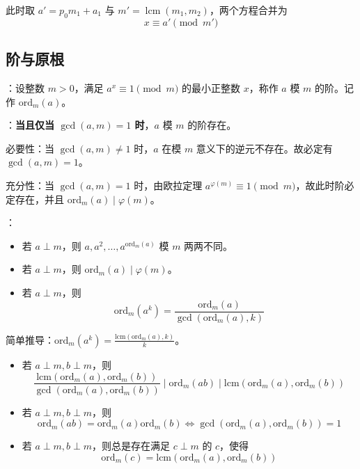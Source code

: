 此时取 $a' = p_0m_1 + a_1$ 与 $m' = \operatorname{lcm}(m_1, m_2)$，两个方程合并为
\[
x \equiv a' \pmod{m'}
\]

\subsection{阶与原根}

：设整数 $m > 0$，满足 $a^x \equiv 1 \pmod m$ 的最小正整数 $x$，称作 $a$ 模 $m$ 的阶。记作 $\mathrm{ord}_m(a)$。

：\textbf{当且仅当 $\gcd(a, m) = 1$ 时}，$a$ 模 $m$ 的阶存在。

\begin{quoteblock}
必要性：当 $\gcd(a, m) \neq 1$ 时，$a$ 在模 $m$ 意义下的逆元不存在。故必定有 $\gcd(a, m) = 1$。

充分性：当 $\gcd(a, m) = 1$ 时，由欧拉定理 $a^{\varphi(m)} \equiv 1 \pmod m$，故此时阶必定存在，并且 $\mathrm{ord}_m(a) \mid \varphi(m)$。
\end{quoteblock}

：

\begin{itemize}
    \item 若 $a\perp m$，则 $a, a^2, \dots, a^{\mathrm{ord}_m(a)}$ 模 $m$ 两两不同。
    \item 若 $a \perp m$，则 $\mathrm{ord}_m(a) \mid \varphi(m)$。
    \item 若 $a \perp m$，则
    \[
    \mathrm{ord}_m(a^k) = \frac{\mathrm{ord}_m(a)}{\gcd(\mathrm{ord}_m(a), k)}
    \]

\end{itemize}

简单推导：$\mathrm{ord}_m(a^k) = \frac{\mathrm{lcm}(\mathrm{ord}_m(a), k)}{k}$。

\begin{itemize}
    \item 若 $a\perp m, b\perp m$，则
    \[
    \frac{\mathrm{lcm}(\mathrm{ord}_m(a), \mathrm{ord}_m(b))}{\gcd(\mathrm{ord}_m(a), \mathrm{ord}_m(b))} \mid
    \mathrm{ord}_m(ab)
    \mid \mathrm{lcm}(\mathrm{ord}_m(a), \mathrm{ord}_m(b))
    \]

    \item 若 $a \perp m, b \perp m$，则
    \[
    \mathrm{ord}_m(ab) = \mathrm{ord}_m(a)\mathrm{ord}_m(b) \iff \gcd(\mathrm{ord}_m(a), \mathrm{ord}_m(b)) = 1
    \]

    \item 若 $a \perp m, b\perp m$，则总是存在满足 $c\perp m$ 的 $c$，使得
    \[
    \mathrm{ord}_m(c) = \mathrm{lcm}(\mathrm{ord}_m(a), \mathrm{ord}_m(b))
    \]
\end{itemize}

